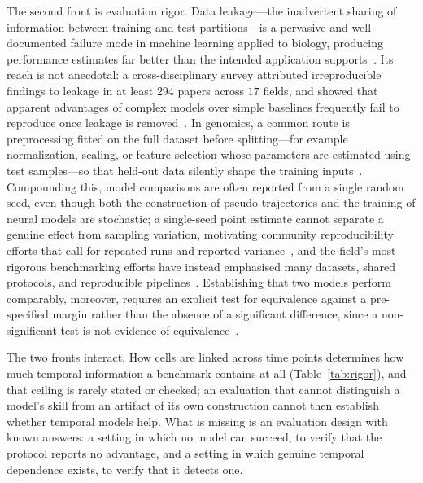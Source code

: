 \documentclass[10pt,letterpaper]{article}
\begin{document}
The second front is evaluation rigor. Data leakage---the inadvertent sharing of information between training and test partitions---is a pervasive and well-documented failure mode in machine learning applied to biology, producing performance estimates far better than the intended application supports~\cite{whalen2022navigating,bernett2024guiding}. Its reach is not anecdotal: a cross-disciplinary survey attributed irreproducible findings to leakage in at least $294$ papers across $17$ fields, and showed that apparent advantages of complex models over simple baselines frequently fail to reproduce once leakage is removed~\cite{kapoor2023leakage}. In genomics, a common route is preprocessing fitted on the full dataset before splitting---for example normalization, scaling, or feature selection whose parameters are estimated using test samples---so that held-out data silently shape the training inputs~\cite{whalen2022navigating}. Compounding this, model comparisons are often reported from a single random seed, even though both the construction of pseudo-trajectories and the training of neural models are stochastic; a single-seed point estimate cannot separate a genuine effect from sampling variation, motivating community reproducibility efforts that call for repeated runs and reported variance~\cite{pineau2021improving}, and the field's most rigorous benchmarking efforts have instead emphasised many datasets, shared protocols, and reproducible pipelines~\cite{saelens2019comparison}. Establishing that two models perform comparably, moreover, requires an explicit test for equivalence against a pre-specified margin rather than the absence of a significant difference, since a non-significant test is not evidence of equivalence~\cite{lakens2017equivalence}.

The two fronts interact. How cells are linked across time points determines how much temporal information a benchmark contains at all (Table~\ref{tab:rigor}), and that ceiling is rarely stated or checked; an evaluation that cannot distinguish a model's skill from an artifact of its own construction cannot then establish whether temporal models help. What is missing is an evaluation design with known answers: a setting in which no model can succeed, to verify that the protocol reports no advantage, and a setting in which genuine temporal dependence exists, to verify that it detects one.
\end{document}
